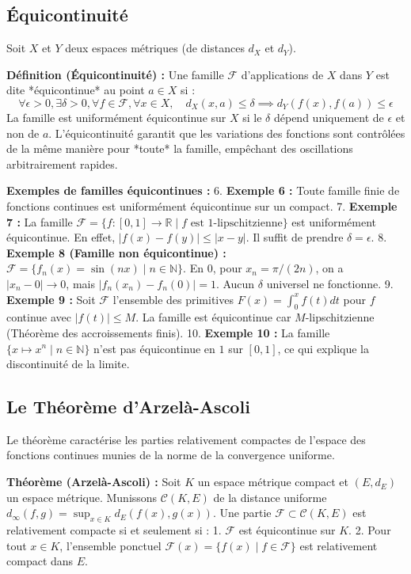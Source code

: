 \documentclass[11pt,a4paper]{article}
\begin{document}
\subsection*{Équicontinuité}

Soit $X$ et $Y$ deux espaces métriques (de distances $d_X$ et $d_Y$).

\textbf{Définition (Équicontinuité) :}
Une famille $\mathcal{F}$ d'applications de $X$ dans $Y$ est dite *équicontinue* au point $a \in X$ si :
$$ \forall \epsilon > 0, \exists \delta > 0, \forall f \in \mathcal{F}, \forall x \in X, \quad d_X(x, a) \le \delta \implies d_Y(f(x), f(a)) \le \epsilon $$
La famille est uniformément équicontinue sur $X$ si le $\delta$ dépend uniquement de $\epsilon$ et non de $a$. L'équicontinuité garantit que les variations des fonctions sont contrôlées de la même manière pour *toute* la famille, empêchant des oscillations arbitrairement rapides.

\textbf{Exemples de familles équicontinues :}
6. \textbf{Exemple 6 :} Toute famille finie de fonctions continues est uniformément équicontinue sur un compact.
7. \textbf{Exemple 7 :} La famille $\mathcal{F} = \{f : [0,1] \to \mathbb{R} \mid f \text{ est } 1\text{-lipschitzienne}\}$ est uniformément équicontinue. En effet, $|f(x)-f(y)| \le |x-y|$. Il suffit de prendre $\delta = \epsilon$.
8. \textbf{Exemple 8 (Famille non équicontinue) :} $\mathcal{F} = \{f_n(x) = \sin(nx) \mid n \in \mathbb{N}\}$. En $0$, pour $x_n = \pi/(2n)$, on a $|x_n - 0| \to 0$, mais $|f_n(x_n) - f_n(0)| = 1$. Aucun $\delta$ universel ne fonctionne.
9. \textbf{Exemple 9 :} Soit $\mathcal{F}$ l'ensemble des primitives $F(x) = \int_0^x f(t)dt$ pour $f$ continue avec $|f(t)| \le M$. La famille est équicontinue car $M$-lipschitzienne (Théorème des accroissements finis).
10. \textbf{Exemple 10 :} La famille $\{x \mapsto x^n \mid n \in \mathbb{N}\}$ n'est pas équicontinue en $1$ sur $[0,1]$, ce qui explique la discontinuité de la limite.

\subsection*{Le Théorème d'Arzelà-Ascoli}

Le théorème caractérise les parties relativement compactes de l'espace des fonctions continues munies de la norme de la convergence uniforme.

\textbf{Théorème (Arzelà-Ascoli) :}
Soit $K$ un espace métrique compact et $(E, d_E)$ un espace métrique. Munissons $\mathcal{C}(K, E)$ de la distance uniforme $d_\infty(f, g) = \sup_{x \in K} d_E(f(x), g(x))$.
Une partie $\mathcal{F} \subset \mathcal{C}(K, E)$ est relativement compacte si et seulement si :
1. $\mathcal{F}$ est équicontinue sur $K$.
2. Pour tout $x \in K$, l'ensemble ponctuel $\mathcal{F}(x) = \{f(x) \mid f \in \mathcal{F}\}$ est relativement compact dans $E$.
\end{document}
